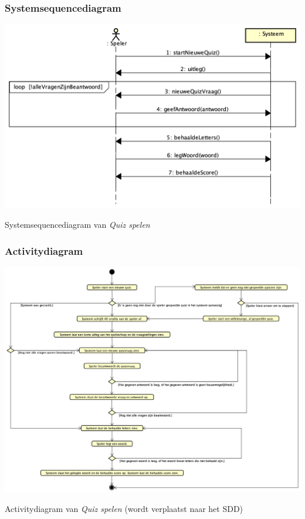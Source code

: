 \subsubsection{Systemsequencediagram}
\begin{mpfigure}
   \centering
   \includegraphics[width=\textwidth]{../Afbeeldingen/Quiz spelen sequence diagram.png}
   \caption{Systemsequencediagram van \textit{Quiz spelen}} \label{fig:quizspelensequencediagram}
\end{mpfigure}

\begin{landscape}
   \subsubsection{Activitydiagram}
   \begin{mpfigure}
      \centering
      \includegraphics[scale=0.37]{../Afbeeldingen/Quiz spelen activity diagram.png}
      \caption{Activitydiagram van \textit{Quiz spelen} (wordt verplaatst naar het SDD)} \label{fig:adquizspelen}
   \end{mpfigure}
\end{landscape}


